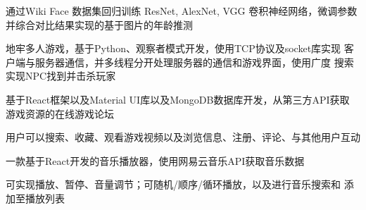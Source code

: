 \documentclass[]{deedy-resume-openfont}
\begin{document}
\begin{minipage}[t]{0.73\textwidth}
\sectionsep

\begin{tightemize}
    \item 通过Wiki Face 数据集回归训练 ResNet, AlexNet, VGG 卷积神经网络，微调参数并综合对比结果实现的基于图片的年龄推测
    \end{tightemize}

\sectionsep

\begin{tightemize}
    \item 地牢多人游戏，基于Python、观察者模式开发，使用TCP协议及socket库实现
    客户端与服务器通信，并多线程分开处理服务器的通信和游戏界面，使用广度
    搜索实现NPC找到并击杀玩家
    \end{tightemize}

\sectionsep

\begin{tightemize}
    \item 基于React框架以及Material UI库以及MongoDB数据库开发，从第三方API获取
    游戏资源的在线游戏论坛
    \item 用户可以搜索、收藏、观看游戏视频以及浏览信息、注册、评论、与其他用户互动
    \end{tightemize}
    
\sectionsep

\begin{tightemize}
    \item 一款基于React开发的音乐播放器，使用网易云音乐API获取音乐数据
    \item 可实现播放、暂停、音量调节；可随机/顺序/循环播放，以及进行音乐搜索和
    添加至播放列表
    \end{tightemize}





% 
% 

\end{minipage} 
\end{document}
